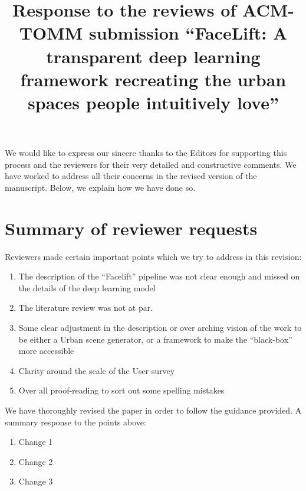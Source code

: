 \documentclass{paper}
\newenvironment{myquote}
{\definecolor{shadecolor}{rgb}{0.9,0.95,1} \begin{shaded*} \sf \em}
{\em\end{shaded*}}
\newenvironment{myquoteOrange}
{\definecolor{shadecolor}{rgb}{1,0.9,0.83} \begin{shaded*} \sf \em}
{\em\end{shaded*}}
\begin{document}


\title{Response to the reviews of ACM-TOMM submission ``FaceLift: A transparent deep learning framework recreating the urban spaces people intuitively love''}
\maketitle

We would like to express our sincere thanks to the Editors for supporting this process and the reviewers for their very detailed and constructive comments. We have worked to address all their concerns in the revised version of the manuscript. Below, we explain how we have done so.


\section*{Summary of reviewer requests}

\begin{myquote}

\noindent Reviewers made certain important points which we try to address in this revision:

\begin{enumerate}
\item The description of the ``Facelift'' pipeline was not clear enough and missed on the details of the deep learning model
\item The literature review was not at par. 
\item Some clear adjustment in the description or over arching vision of the work to be either a Urban scene generator, or a framework to make the ``black-box'' more accessible
\item Clarity around the scale of the User survey
\item Over all proof-reading to sort out some spelling mistakes
\end{enumerate}

\noindent We have thoroughly revised the paper in order to follow the guidance provided. A summary response to the points above:

\begin{enumerate}

\item Change 1 
\item Change 2
\item Change 3 


\end{enumerate}

\end{myquote}
\end{document}
